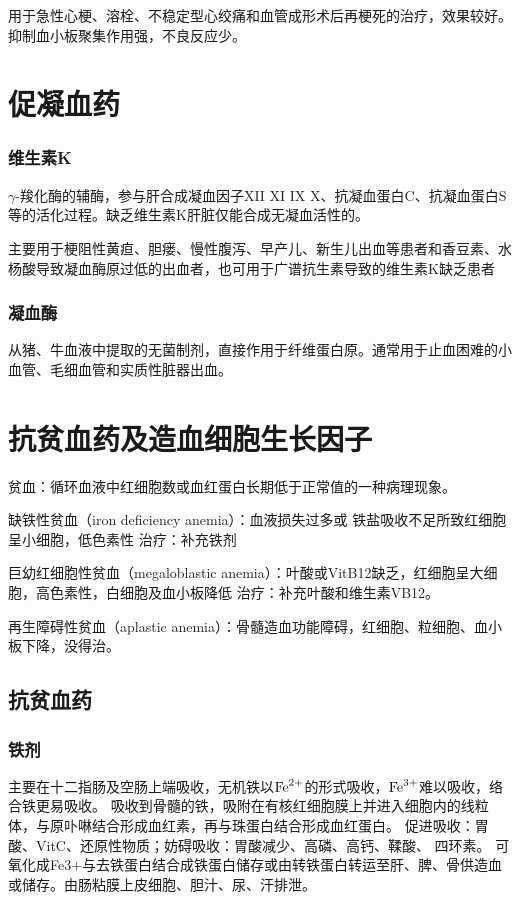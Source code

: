 \documentclass[UTF8]{ctexbook}
\begin{document}
用于急性心梗、溶栓、不稳定型心绞痛和血管成形术后再梗死的治疗，效果较好。抑制血小板聚集作用强，不良反应少。

\section{促凝血药}
\subsubsection{维生素K}
\(\gamma\)-羧化酶的辅酶，参与肝合成凝血因子XII XI IX X、抗凝血蛋白C、抗凝血蛋白S等的活化过程。缺乏维生素K肝脏仅能合成无凝血活性的。

主要用于梗阻性黄疸、胆瘘、慢性腹泻、早产儿、新生儿出血等患者和香豆素、水杨酸导致凝血酶原过低的出血者，也可用于广谱抗生素导致的维生素K缺乏患者
\subsubsection{凝血酶}
从猪、牛血液中提取的无菌制剂，直接作用于纤维蛋白原。通常用于止血困难的小血管、毛细血管和实质性脏器出血。
\section{抗贫血药及造血细胞生长因子}
贫血：循环血液中红细胞数或血红蛋白长期低于正常值的一种病理现象。

缺铁性贫血（iron deficiency anemia）：血液损失过多或 铁盐吸收不足所致红细胞呈小细胞，低色素性 治疗：补充铁剂

巨幼红细胞性贫血（megaloblastic anemia）：叶酸或VitB12缺乏，红细胞呈大细胞，高色素性，白细胞及血小板降低 治疗：补充叶酸和维生素VB12。

再生障碍性贫血（aplastic anemia）：骨髓造血功能障碍，红细胞、粒细胞、血小板下降，没得治。
\subsection{抗贫血药}
\subsubsection{铁剂}
主要在十二指肠及空肠上端吸收，无机铁以\(\textup{Fe}^{2+}\)的形式吸收，\(\textup{Fe}^{3+}\)难以吸收，络合铁更易吸收。
吸收到骨髓的铁，吸附在有核红细胞膜上并进入细胞内的线粒体，与原卟啉结合形成血红素，再与珠蛋白结合形成血红蛋白。
促进吸收：胃酸、VitC、还原性物质；妨碍吸收：胃酸减少、高磷、高钙、鞣酸、 四环素。
可氧化成Fe3+与去铁蛋白结合成铁蛋白储存或由转铁蛋白转运至肝、脾、骨供造血或储存。由肠粘膜上皮细胞、胆汁、尿、汗排泄。
\end{document}
